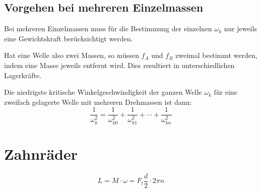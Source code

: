 	\subsection{Vorgehen bei mehreren Einzelmassen} %
		Bei mehreren Einzelmassen muss für die Bestimmung der einzelnen $\omega_k$ nur jeweils eine Gewichtskraft berücksichtigt werden.
		
		Hat eine Welle also zwei Massen, so müssen $f_A$ und $f_B$ zweimal bestimmt werden, indem eine Masse jeweils entfernt wird. Dies resultiert in unterschiedlichen Lagerkräfte.
		
		Die niedrigste kritische Winkelgeschwindigkeit der ganzen Welle $\omega_k$ für eine zweifach gelagerte Welle mit mehreren Drehmassen ist dann:
		\begin{equation*}
			\frac{1}{\omega_k^2} = \frac{1}{\omega_{k0}^2} + \frac{1}{\omega_{k1}^2} + \cdots + \frac{1}{\omega_{kn}^2}
		\end{equation*}

\section{Zahnräder} %
	\[
		L = M\cdot \omega = F_t \frac{d}{2} \cdot 2\pi n
	\]
